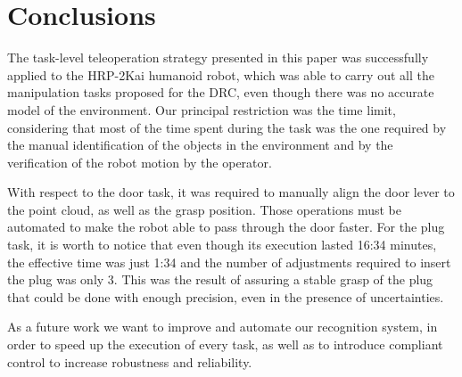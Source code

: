 \section{Conclusions}
	\label{sec:conclusions}
	
	The task-level teleoperation strategy presented in this paper was successfully applied
	to the HRP-2Kai humanoid robot, which was able to carry out all the manipulation tasks
	proposed for the DRC, even though there was no accurate model of the environment.	
	Our principal restriction was the time limit, considering that most of the time spent
	during the task was the one required by the manual identification of the objects in the
	environment and by the verification of the robot motion by the operator.

	With respect to the door task, it was required to manually align the door lever to the
	point cloud, as well as the grasp position.
	Those operations must be automated to make the robot able to pass through the door faster.
	For the plug task, it is worth to notice that even though its execution lasted 16:34 minutes,
	the effective time was just 1:34 and the number of adjustments required to insert the plug was
	only 3.
	This was the result of assuring a stable grasp of the plug that could be done with enough
	precision, even in the presence of uncertainties.
	
	As a future work we want to improve and automate our recognition system,
	in order to speed up the execution of every task, as well as to introduce compliant control
	to increase robustness and reliability.
